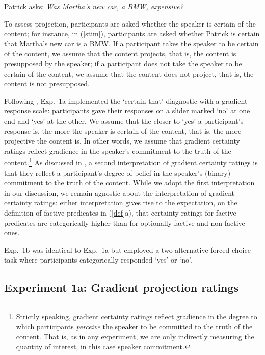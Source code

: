 \documentclass[11pt,fleqn]{article}
\newcommand{\6}{\mbox{$[\hspace*{-.6mm}[$}}
\newcommand{\9}{\mbox{$]\hspace*{-.6mm}]$}}
\begin{document}
\begin{exe}

\ex\label{stim} Patrick asks: {\em Was Martha's new car, a BMW, expensive?} 

\end{exe}
To assess projection, participants are asked whether the speaker is certain of the content; for instance, in (\ref{stim}), participants are asked whether Patrick is certain that Martha's new car is a BMW. If a participant takes the speaker to be certain of the content, we assume that the content projects, that is, the content is presupposed by the speaker; if a participant does not take the speaker to be certain of the content, we assume that the content does not project, that is, the content is not presupposed.

Following \citealt{tbd-variability}, Exp.~1a implemented the `certain that' diagnostic with a gradient response scale: participants gave their responses on a slider marked `no' at one end and `yes' at the other. We assume that the closer to `yes' a participant's response is, the more the speaker is certain of the content, that is, the more projective the content is. In other words, we assume that gradient certainty ratings reflect gradience in the speaker's commitment to the truth of the content.\footnote{Strictly speaking,  gradient certainty ratings reflect gradience in the degree to which participants \emph{perceive} the speaker to be committed to the truth of the content. That is, as in any experiment, we are only indirectly measuring the quantity of interest, in this case speaker commitment.} As discussed in \citealt{tbd-variability}, a second interpretation of gradient certainty ratings is that they reflect a participant's degree of belief in the speaker's (binary) commitment to the truth of the content. While we adopt the first interpretation in our discussion, we remain agnostic about the interpretation of gradient certainty ratings: either interpretation gives rise to the expectation,  on the definition of factive predicates in (\ref{def}a), that certainty ratings for factive predicates are categorically higher than for optionally factive and non-factive ones. 

Exp.~1b was identical to Exp.~1a but employed a two-alternative forced choice task where participants categorically responded `yes' or `no'.
 
\subsection{Experiment 1a: Gradient projection ratings}\label{s-exp1a}
\end{document}
